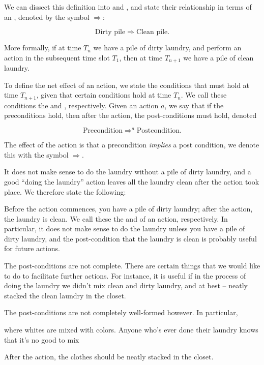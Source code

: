We can dissect this definition into
 and , and state their relationship in
terms of an , denoted by the symbol $\Rightarrow$:

\begin{equation}
\text{Dirty pile}\Rightarrow \text{Clean pile}.
\end{equation}



More formally, if at time $T_n$ we
have a pile of dirty laundry, and perform an action in the subsequent time slot
$T_1$, then at time $T_{n+1}$ we have a pile of clean laundry.


To define the
net effect of an action, we state the conditions that must hold at time
$T_{n+1}$, given that certain conditions hold at time $T_n$. We call these
conditions the  and , respectively. Given an
action $a$, we say that if the preconditions hold, then after the action, the
post-conditions must hold, denoted

\begin{equation}
\text{Precondition} \Rightarrow^a \text{Postcondition}.
\end{equation}


The effect
of the action is that a precondition \emph{implies} a post condition, we denote
this with the symbol $\Rightarrow$.

It does not make sense to do the laundry without a pile of dirty laundry, and a
good ``doing the laundry'' action leaves all the laundry clean after the action
took place. We therefore state the following:

 Before the action
commences, you have a pile of dirty laundry; after the action, the laundry is
clean. We call these the  and  of an action,
respectively. In particular, it does not make sense to do the laundry unless
you have a pile of dirty laundry, and the post-condition that the laundry is
clean is probably useful for future actions.

The post-conditions are not complete. There are certain things that we would
like to do to facilitate further actions. For instance, it is useful if in the
process of doing the laundry we didn't mix clean and dirty laundry, and at best
-- neatly stacked the clean laundry in the closet.


The post-conditions are not
completely well-formed however. In particular, 

where whites are mixed with
colors. Anyone who's ever done their laundry knows that it's no good to mix 

After the action, the clothes should be neatly stacked in the closet. 

